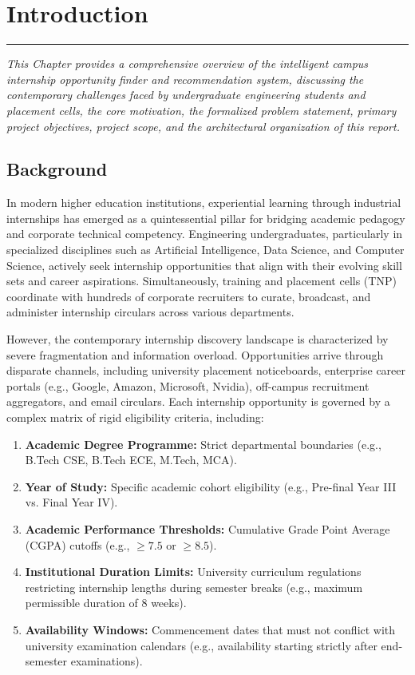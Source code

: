 \chapter{Introduction}
\label{C1} %
\graphicspath{{images/}{Figures/}}
\noindent\rule{\linewidth}{2pt}
\textit{This Chapter provides a comprehensive overview of the intelligent campus internship opportunity finder and recommendation system, discussing the contemporary challenges faced by undergraduate engineering students and placement cells, the core motivation, the formalized problem statement, primary project objectives, project scope, and the architectural organization of this report.}
\section{Background} \label{S1.1}
In modern higher education institutions, experiential learning through industrial internships has emerged as a quintessential pillar for bridging academic pedagogy and corporate technical competency. Engineering undergraduates, particularly in specialized disciplines such as Artificial Intelligence, Data Science, and Computer Science, actively seek internship opportunities that align with their evolving skill sets and career aspirations. Simultaneously, training and placement cells (TNP) coordinate with hundreds of corporate recruiters to curate, broadcast, and administer internship circulars across various departments.

However, the contemporary internship discovery landscape is characterized by severe fragmentation and information overload. Opportunities arrive through disparate channels, including university placement noticeboards, enterprise career portals (e.g., Google, Amazon, Microsoft, Nvidia), off-campus recruitment aggregators, and email circulars. Each internship opportunity is governed by a complex matrix of rigid eligibility criteria, including:
\begin{enumerate}[label=\textbf{\alph*)}]
	\item \textbf{Academic Degree Programme:} Strict departmental boundaries (e.g., B.Tech CSE, B.Tech ECE, M.Tech, MCA).
	\item \textbf{Year of Study:} Specific academic cohort eligibility (e.g., Pre-final Year III vs. Final Year IV).
	\item \textbf{Academic Performance Thresholds:} Cumulative Grade Point Average (CGPA) cutoffs (e.g., $\ge 7.5$ or $\ge 8.5$).
	\item \textbf{Institutional Duration Limits:} University curriculum regulations restricting internship lengths during semester breaks (e.g., maximum permissible duration of 8 weeks).
	\item \textbf{Availability Windows:} Commencement dates that must not conflict with university examination calendars (e.g., availability starting strictly after end-semester examinations).
\end{enumerate}

